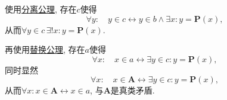 \documentclass[UTF8]{ctexart}
\begin{document}

使用\href{01 ZFC 公理#nameddest=sec:分离公理模式}{分离公理}, 存在$c$使得
\[
    \forall y:\quad y\in c\leftrightarrow y\in b\land\exists x:y=\mathbf{P}(x),
\]
从而$\forall y\in c\,\exists! x:y=\mathbf{P}(x)$.

再使用\href{01 ZFC 公理#nameddest=sec:替换公理模式}{替换公理}, 存在$a$使得
\[
    \forall x:\quad x\in a\leftrightarrow\exists y\in c:y=\mathbf{P}(x),
\]
同时显然
\[
    \forall x:\quad x\in\mathbf{A}\leftrightarrow\exists y\in c:y=\mathbf{P}(x),
\]
从而$\forall x:x\in\mathbf{A}\leftrightarrow x\in a$, 与$\mathbf{A}$是真类矛盾.
\end{document}
